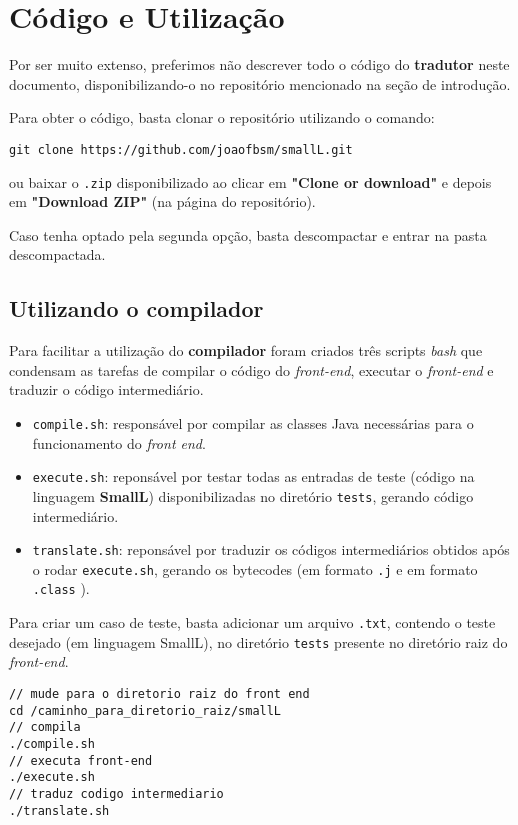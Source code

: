 \section{Código e Utilização}

Por ser muito extenso, preferimos não descrever todo o código do \textbf{tradutor} neste documento, disponibilizando-o no repositório mencionado na seção de introdução.

Para obter o código, basta clonar o repositório utilizando o comando:

\begin{lstlisting}
git clone https://github.com/joaofbsm/smallL.git
\end{lstlisting}

ou baixar o \texttt{.zip} disponibilizado ao clicar em \textbf{"Clone or download"} e depois em \textbf{"Download ZIP"} (na página do repositório).

Caso tenha optado pela segunda opção, basta descompactar e entrar na pasta descompactada.

\subsection{Utilizando o compilador}
Para facilitar a utilização do \textbf{compilador} foram criados três scripts \textit{bash} que condensam as tarefas de compilar o código do \textit{front-end}, executar o \textit{front-end} e traduzir o código intermediário.

\begin{itemize}
\item \texttt{compile.sh}: responsável por compilar as classes Java necessárias para o funcionamento do \textit{front end}.
\item \texttt{execute.sh}: reponsável por testar todas as entradas de teste (código na linguagem \textbf{SmallL}) disponibilizadas no diretório \texttt{tests}, gerando código intermediário.
\item \texttt{translate.sh}: reponsável por traduzir os códigos intermediários obtidos após o rodar \texttt{execute.sh}, gerando os bytecodes (em formato \texttt{.j} e em formato \texttt{.class} ). 
\end{itemize}

Para criar um caso de teste, basta adicionar um arquivo \texttt{.txt}, contendo o teste desejado (em linguagem SmallL), no diretório \texttt{tests} presente no diretório raiz do \textit{front-end}.

\begin{lstlisting}
// mude para o diretorio raiz do front end
cd /caminho_para_diretorio_raiz/smallL
// compila
./compile.sh
// executa front-end
./execute.sh
// traduz codigo intermediario
./translate.sh
\end{lstlisting}

